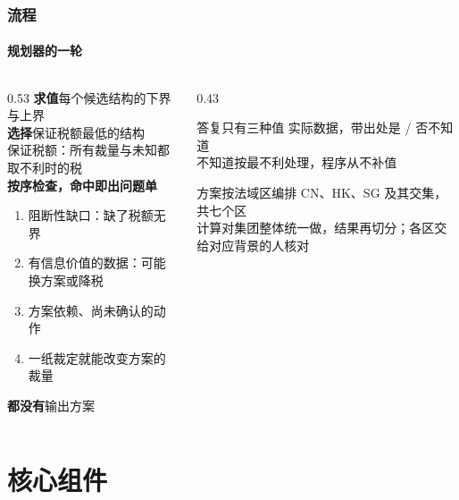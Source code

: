 \documentclass[english, sectionpage=false]{tumbeamer}
\newcommand{\subnote}[1]{{\footnotesize\color{TUMGrayDark} #1}}
\begin{document}
\begin{frame}
  \frametitle{流程}
  \framesubtitle{规划器的一轮}
  \begin{columns}[T]
    \begin{column}{0.53\textwidth}
      \textcolor{TUMBlue}{\textbf{求值}}\quad 每个候选结构的下界与上界\\[0.15em]
      \textcolor{TUMBlue}{\textbf{选择}}\quad 保证税额最低的结构\\
      \subnote{保证税额：所有裁量与未知都取不利时的税}\\[0.4em]
      \textcolor{TUMBlue}{\textbf{按序检查，命中即出问题单}}
      \begin{enumerate}
        \item 阻断性缺口：缺了税额无界
        \item 有信息价值的数据：可能换方案或降税
        \item 方案依赖、尚未确认的动作
        \item 一纸裁定就能改变方案的裁量
      \end{enumerate}
      \textcolor{TUMBlue}{\textbf{都没有}}\quad 输出方案
    \end{column}
    \begin{column}{0.43\textwidth}
      \begin{TUMBox}[TUMOrange]{答复只有三种值}
        实际数据，带出处\quad 是 / 否\quad 不知道\\
        \subnote{不知道按最不利处理，程序从不补值}
      \end{TUMBox}
      \vspace{0.5em}
      \begin{TUMBox}{方案按法域区编排}
        CN、HK、SG 及其交集，共七个区\\
        \subnote{计算对集团整体统一做，结果再切分；各区交给对应背景的人核对}
      \end{TUMBox}
    \end{column}
  \end{columns}
\end{frame}

\section{核心组件}
\end{document}
